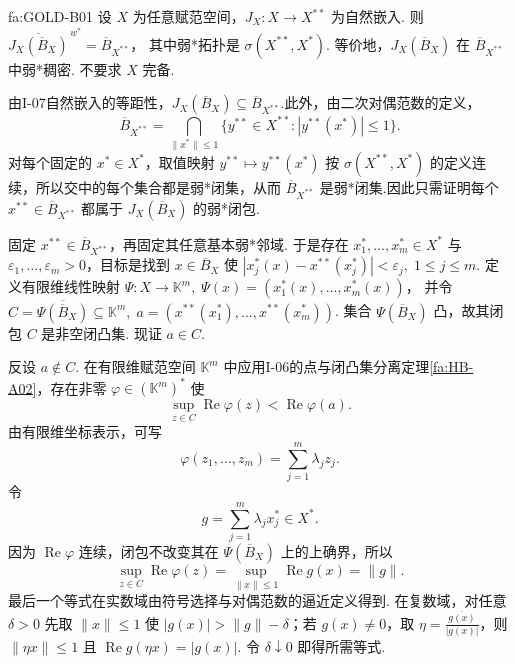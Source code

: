\begin{FATheorem}[B][Goldstine定理]{fa:GOLD-B01}
设 \(\displaystyle X\) 为任意赋范空间，\(\displaystyle J_X:X\to X^{**}\) 为自然嵌入. 则
\(\displaystyle \overline{J_X(\overline B_X)}^{\,w^*} = \overline B_{X^{**}}\)，
其中弱*拓扑是 \(\displaystyle \sigma(X^{**},X^*)\). 等价地，\(\displaystyle J_X(\overline B_X)\) 在 \(\displaystyle \overline B_{X^{**}}\) 中弱*稠密. 不要求 \(\displaystyle X\) 完备.
\end{FATheorem}

\begin{FAProof}
由I-07自然嵌入的等距性，\(\displaystyle J_X(\overline B_X)\subseteq\overline B_{X^{**}}\).此外，由二次对偶范数的定义，
\[
\overline B_{X^{**}}=\bigcap_{\|x^*\|\leqslant 1}\bigl\{y^{**}\in X^{**}:|y^{**}(x^*)|\leqslant 1\bigr\}.
\]
对每个固定的 \(\displaystyle x^*\in X^*\)，取值映射 \(\displaystyle y^{**}\mapsto y^{**}(x^*)\) 按 \(\displaystyle \sigma(X^{**},X^*)\) 的定义连续，所以交中的每个集合都是弱*闭集，从而 \(\displaystyle \overline B_{X^{**}}\) 是弱*闭集.因此只需证明每个 \(\displaystyle x^{**}\in\overline B_{X^{**}}\) 都属于 \(\displaystyle J_X(\overline B_X)\) 的弱*闭包.

固定 \(\displaystyle x^{**}\in\overline B_{X^{**}}\)，再固定其任意基本弱*邻域. 于是存在 \(\displaystyle x_1^*,\dots,x_m^*\in X^*\) 与 \(\displaystyle \varepsilon_1,\dots,\varepsilon_m>0\)，目标是找到 \(\displaystyle x\in\overline B_X\) 使
\(\displaystyle |x_j^*(x)-x^{**}(x_j^*)|<\varepsilon_j, \; 1\leqslant j\leqslant m\).
定义有限维线性映射
\(\displaystyle \Psi:X\to\mathbb K^m, \; \Psi(x)=(x_1^*(x),\dots,x_m^*(x))\)，
并令
\(\displaystyle C=\overline{\Psi(\overline B_X)}\subseteq\mathbb K^m, \; a=(x^{**}(x_1^*),\dots,x^{**}(x_m^*))\).
集合 \(\displaystyle \Psi(\overline B_X)\) 凸，故其闭包 \(\displaystyle C\) 是非空闭凸集. 现证 \(\displaystyle a\in C\).

反设 \(\displaystyle a\notin C\). 在有限维赋范空间 \(\displaystyle \mathbb K^m\) 中应用I-06的点与闭凸集分离定理\autoref{fa:HB-A02}，存在非零 \(\displaystyle \varphi\in(\mathbb K^m)^*\) 使
\[
\sup_{z\in C}\operatorname{Re}\varphi(z)
<
\operatorname{Re}\varphi(a).
\]
由有限维坐标表示，可写
\[
\varphi(z_1,\dots,z_m)=\sum_{j=1}^m\lambda_jz_j.
\]
令
\[
g=\sum_{j=1}^m\lambda_jx_j^*\in X^*.
\]
因为 \(\displaystyle \operatorname{Re}\varphi\) 连续，闭包不改变其在 \(\displaystyle \Psi(\overline B_X)\) 上的上确界，所以
\[
\sup_{z\in C}\operatorname{Re}\varphi(z)
=
\sup_{\|x\|\leqslant1}\operatorname{Re}g(x)
=
\|g\|.
\]
最后一个等式在实数域由符号选择与对偶范数的逼近定义得到. 在复数域，对任意 \(\displaystyle \delta>0\) 先取 \(\displaystyle \|x\|\leqslant1\) 使 \(\displaystyle |g(x)|>\|g\|-\delta\)；若 \(\displaystyle g(x)\neq0\)，取 \(\displaystyle \eta=\frac{\overline{g(x)}}{|g(x)|}\)，则 \(\displaystyle \|\eta x\|\leqslant1\) 且 \(\displaystyle \operatorname{Re}g(\eta x)=|g(x)|\). 令 \(\displaystyle \delta\downarrow0\) 即得所需等式.


\end{FAProof}
